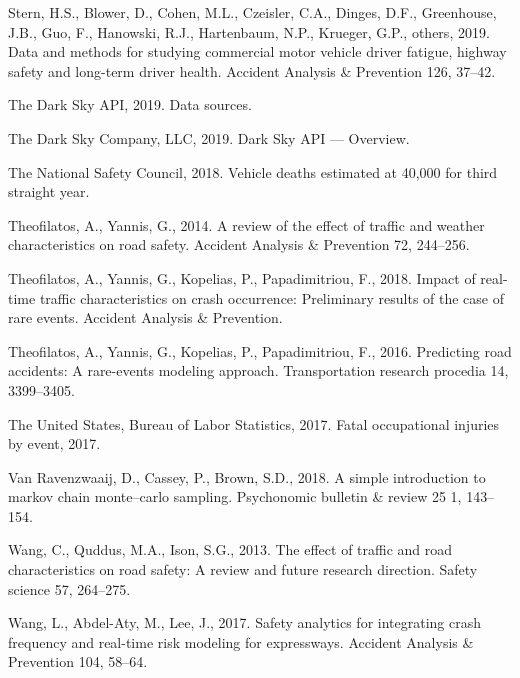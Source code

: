\documentclass[12pt]{book}
\numberwithin{equation}{chapter}
\begin{document}
\leavevmode\hypertarget{ref-stern2019data}{}%
Stern, H.S., Blower, D., Cohen, M.L., Czeisler, C.A., Dinges, D.F., Greenhouse, J.B., Guo, F., Hanowski, R.J., Hartenbaum, N.P., Krueger, G.P., others, 2019. Data and methods for studying commercial motor vehicle driver fatigue, highway safety and long-term driver health. Accident Analysis \& Prevention 126, 37--42.

\leavevmode\hypertarget{ref-darkskyds}{}%
The Dark Sky API, 2019. Data sources.

\leavevmode\hypertarget{ref-darksky}{}%
The Dark Sky Company, LLC, 2019. Dark Sky API --- Overview.

\leavevmode\hypertarget{ref-nsc2018}{}%
The National Safety Council, 2018. Vehicle deaths estimated at 40,000 for third straight year.

\leavevmode\hypertarget{ref-theofilatos2014review}{}%
Theofilatos, A., Yannis, G., 2014. A review of the effect of traffic and weather characteristics on road safety. Accident Analysis \& Prevention 72, 244--256.

\leavevmode\hypertarget{ref-theofilatos2018impact}{}%
Theofilatos, A., Yannis, G., Kopelias, P., Papadimitriou, F., 2018. Impact of real-time traffic characteristics on crash occurrence: Preliminary results of the case of rare events. Accident Analysis \& Prevention.

\leavevmode\hypertarget{ref-theofilatos2016predicting}{}%
Theofilatos, A., Yannis, G., Kopelias, P., Papadimitriou, F., 2016. Predicting road accidents: A rare-events modeling approach. Transportation research procedia 14, 3399--3405.

\leavevmode\hypertarget{ref-bols}{}%
The United States, Bureau of Labor Statistics, 2017. Fatal occupational injuries by event, 2017.

\leavevmode\hypertarget{ref-van2018simple}{}%
Van Ravenzwaaij, D., Cassey, P., Brown, S.D., 2018. A simple introduction to markov chain monte--carlo sampling. Psychonomic bulletin \& review 25 1, 143--154.

\leavevmode\hypertarget{ref-wang2013effect}{}%
Wang, C., Quddus, M.A., Ison, S.G., 2013. The effect of traffic and road characteristics on road safety: A review and future research direction. Safety science 57, 264--275.

\leavevmode\hypertarget{ref-wang2017safety}{}%
Wang, L., Abdel-Aty, M., Lee, J., 2017. Safety analytics for integrating crash frequency and real-time risk modeling for expressways. Accident Analysis \& Prevention 104, 58--64.
\end{document}
